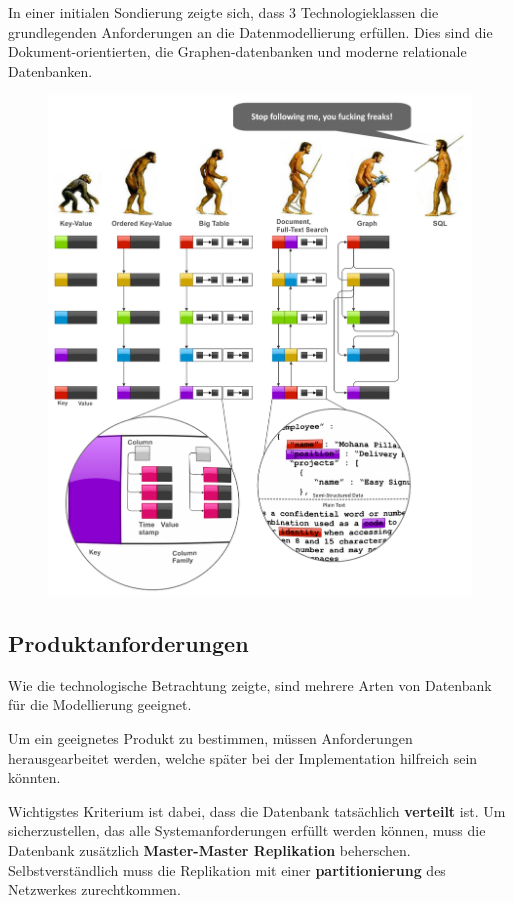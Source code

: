 In einer initialen Sondierung zeigte sich,
dass 3 Technologieklassen die grundlegenden Anforderungen an die Datenmodellierung erf\"ullen.
Dies sind die Dokument-orientierten, die Graphen-datenbanken und moderne relationale Datenbanken.
\begin{figure}
    \includegraphics[width=\textwidth]{images/databases-overview.png}
\end{figure}

\subsection{Produktanforderungen}

Wie die technologische Betrachtung zeigte,
sind mehrere Arten von Datenbank f\"ur die Modellierung geeignet.

Um ein geeignetes Produkt zu bestimmen,
m\"ussen Anforderungen herausgearbeitet werden,
welche sp\"ater bei der Implementation hilfreich sein k\"onnten.

Wichtigstes Kriterium ist dabei, dass die Datenbank tats\"achlich \textbf{verteilt} ist.
Um sicherzustellen, das alle Systemanforderungen erf\"ullt werden k\"onnen,
muss die Datenbank zus\"atzlich \textbf{Master-Master Replikation} beherschen.
Selbstverst\"andlich muss die Replikation mit einer \textbf{partitionierung} des Netzwerkes zurechtkommen.

